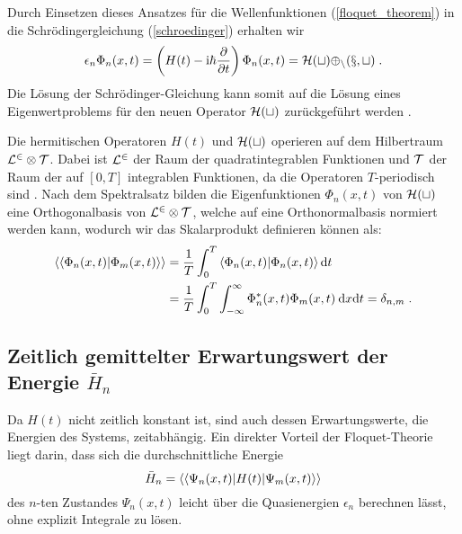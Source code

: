   Durch Einsetzen dieses Ansatzes für die Wellenfunktionen (\ref{floquet_theorem}) in die Schrödingergleichung (\ref{schroedinger}) erhalten wir
  \begin{equation}
    \epsilon_n \Phi_n(x,t) = \left(H(t)-\text{i}\hbar\frac{\partial}{\partial t}\right)\Phi_n(x,t) = \cal{H}(t) \Phi_n(x,t) \; .
    \label{eigenwertproblem}
  \end{equation}
  Die Lösung der Schrödinger-Gleichung kann somit auf die Lösung eines Eigenwertproblems für den neuen Operator $\cal{H}(t)$ zurückgeführt werden \cite{sherly}.

  Die hermitischen Operatoren $H(t)$ und $\cal H(t)$ operieren auf dem Hilbertraum $\cal{L}^2 \otimes \cal{T}$.
  Dabei ist $\cal{L}^2$ der Raum der quadratintegrablen Funktionen und $\cal{T}$ der Raum der auf $[0,T]$ integrablen Funktionen, da die Operatoren $T$-periodisch sind \cite{haengi}.
  Nach dem Spektralsatz bilden die Eigenfunktionen $\Phi_n(x,t)$ von $\cal{H}(t)$ eine Orthogonalbasis von $\cal{L}^2 \otimes \cal{T}$, welche auf eine Orthonormalbasis normiert werden kann, wodurch wir das Skalarprodukt definieren können als:
  \begin{align}
    \begin{split}
    \braket{\braket{\Phi_n(x,t)|\Phi_m(x,t)}} &= \frac{1}{T} \int_0^T \braket{\Phi_n(x,t)|\Phi_n(x,t)} \text{d}t \\
    &= \frac{1}{T} \int_0^T \int_{-\infty}^{\infty} \Phi_n^*(x,t)\Phi_m(x,t) \: \text{d}x\text{d}t = \delta_{n,m} \; .
    \label{skalarprodukt_einzelner}
    \end{split}
  \end{align}


 \subsection{\texorpdfstring{Zeitlich gemittelter Erwartungswert der Energie $\bar{H}_n$}{Zeitlich gemittelter Erwartungswert der Energie bar{H}_n}}

    Da $H(t)$ nicht zeitlich konstant ist, sind auch dessen Erwartungswerte, die Energien des Systems, zeitabhängig.
    Ein direkter Vorteil der Floquet-Theorie liegt darin, dass sich die durchschnittliche Energie
    \begin{equation}
      \bar{H}_n  = \braket{\braket{\Psi_n(x,t)|H(t)|\Psi_m(x,t)}}
    \end{equation}
    des $n$-ten Zustandes $\Psi_n(x,t)$ leicht über die Quasienergien $\epsilon_n$ berechnen lässt, ohne explizit Integrale zu lösen.

